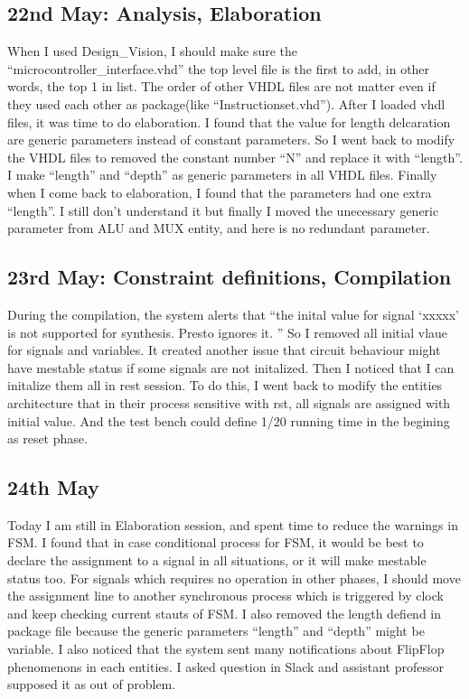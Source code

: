 \subsection{22nd May: Analysis, Elaboration}
When I used Design\_Vision, I should make sure the ``microcontroller\_interface.vhd'' the top level file is the first to add, in other words,
the top 1 in list. The order of other VHDL files are not matter even if they used each other as package(like ``Instructionset.vhd'').
After I loaded vhdl files, it was time to do elaboration. I found that the value for length delcaration are generic parameters instead of
constant parameters. So I went back to modify the VHDL files to removed the constant number ``N'' and replace it with ``length''. I make ``length'' and
``depth'' as generic parameters in all VHDL files. Finally when I come back to elaboration, I found that the parameters had one extra ``length''.
I still don't understand it but finally I moved the unecessary generic parameter from ALU and MUX entity, and here is no redundant parameter.


\subsection{23rd May: Constraint definitions, Compilation}
During the compilation, the system alerts that ``the inital value for signal `xxxxx' is not supported for synthesis. Presto ignores it. ''
So I removed all initial vlaue for signals and variables. It created another issue that circuit behaviour might have mestable status if some signals are
not initalized. Then I noticed that I can initalize them all in rest session. To do this, I went back to modify the entities architecture that 
in their process sensitive with rst, all signals are assigned with initial value. And the test bench could define 1/20 running time in the begining as reset phase. 

\subsection{24th May}
Today I am still in Elaboration session, and spent time to reduce the warnings in FSM. I found that in case conditional process for FSM, it would be best to declare
the assignment to a signal in all situations, or it will make mestable status too. For signals which requires no operation in other phases, I should move the assignment line
to another synchronous process which is triggered by clock and keep checking current stauts of FSM. I also removed the length defiend in package file because the generic
parameters ``length'' and ``depth'' might be variable.
I also noticed that the system sent many notifications about FlipFlop phenomenons in each entities. I asked question in Slack and assistant professor supposed it as out of problem.

